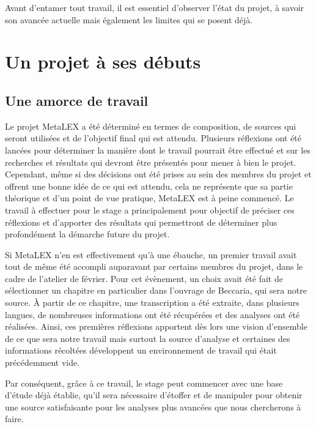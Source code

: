 
Avant d'entamer tout travail, il est essentiel d'observer l'état du projet, à savoir son avancée actuelle mais également les limites qui se posent déjà.

\section{Un projet à ses débuts}
\subsection{Une amorce de travail}
Le projet MetaLEX a été déterminé en termes de composition, de sources qui seront utilisées et de l'objectif final qui est attendu. Plusieurs réflexions ont été lancées pour déterminer la manière dont le travail pourrait être effectué et sur les recherches et résultats qui devront être présentés pour mener à bien le projet. Cependant, même si des décisions ont été prises au sein des membres du projet et offrent une bonne idée de ce qui est attendu, cela ne représente que sa partie théorique et d'un point de vue pratique, MetaLEX est à peine commencé. Le travail à effectuer pour le stage a principalement pour objectif de préciser ces réflexions et d'apporter des résultats qui permettront de déterminer plus profondément la démarche future du projet. 

Si MetaLEX n'en est effectivement qu'à une ébauche, un premier travail avait tout de même été accompli auparavant par certains membres du projet, dans le cadre de l'atelier de février. Pour cet évènement, un choix avait été fait de sélectionner un chapitre en particulier dans l'ouvrage de Beccaria, qui sera notre source. À partir de ce chapitre, une transcription a été extraite, dans plusieurs langues, de nombreuses informations ont été récupérées et des analyses ont été réalisées. Ainsi, ces premières réflexions apportent dès lors une vision d'ensemble de ce que sera notre travail mais surtout la source d'analyse et certaines des informations récoltées développent un environnement de travail qui était précédemment vide. 

Par conséquent, grâce à ce travail, le stage peut commencer avec une base d'étude déjà établie, qu'il sera nécessaire d'étoffer et de manipuler pour obtenir une source satisfaisante pour les analyses plus avancées que nous chercherons à faire.

